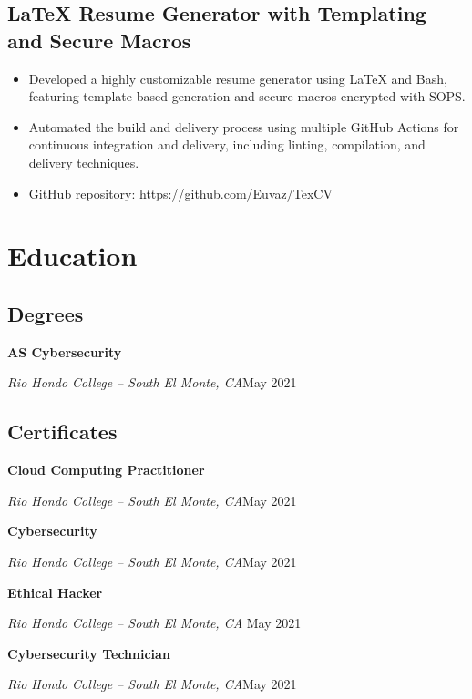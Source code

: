 \documentclass[a4paper]{article}
\begin{document}
\subsection{LaTeX Resume Generator with Templating and Secure Macros}
\begin{itemize}
    \item Developed a highly customizable resume generator using LaTeX and Bash, featuring template-based generation and secure macros encrypted with SOPS\@.
    \item Automated the build and delivery process using multiple GitHub Actions for continuous integration and delivery, including linting, compilation, and delivery techniques.
    \item GitHub repository: \url{https://github.com/Euvaz/TexCV}
\end{itemize}

\section{Education}
\begin{minipage}{\textwidth}
\subsection{Degrees}
\textbf{AS Cybersecurity}\par
\textit{Rio Hondo College -- South El Monte, CA}\hfill May 2021
\end{minipage}

\vspace{20pt}
\begin{minipage}{\textwidth}
\subsection{Certificates}
\textbf{Cloud Computing Practitioner}\par
\textit{Rio Hondo College -- South El Monte, CA}\hfill May 2021

\medskip
\textbf{Cybersecurity}\par
\textit{Rio Hondo College -- South El Monte, CA}\hfill May 2021

\medskip
\textbf{Ethical Hacker}\par
\textit{Rio Hondo College -- South El Monte, CA \hfill}May 2021

\medskip
\textbf{Cybersecurity Technician}\par
\textit{Rio Hondo College -- South El Monte, CA}\hfill May 2021
\end{minipage}
\end{document}

